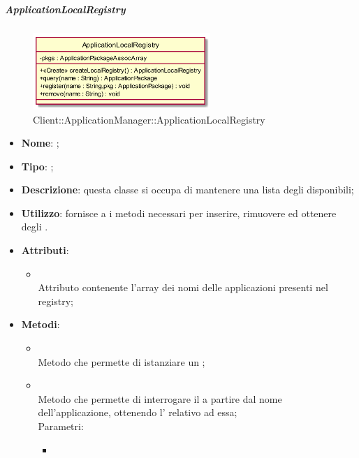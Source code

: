 \hypertarget{ApplicationLocalRegistry_label}{\subparagraph{ApplicationLocalRegistry}}
\begin{figure}[h]
	\centering
	\includegraphics[width=0.60\textwidth,height=\textheight,keepaspectratio]{images/ClassApplicationLocalRegistry.png}
	\caption{Client::ApplicationManager::ApplicationLocalRegistry}
\end{figure}
\begin{itemize}
	\item \textbf{Nome}: ;
	\item \textbf{Tipo}: ;
	\item \textbf{Descrizione}: questa classe si occupa di mantenere una lista degli  disponibili;
	\item \textbf{Utilizzo}: fornisce a  i metodi necessari per inserire, rimuovere ed ottenere degli .
	\item \textbf{Attributi}:
	\begin{itemize}
		\item[]  \\
		Attributo contenente l'array dei nomi delle applicazioni presenti nel registry;
	\end{itemize}
	\item \textbf{Metodi}:
	\begin{itemize}
		\item[]  \\		Metodo che permette di istanziare un ;\\
		\item[]  \\		Metodo che permette di interrogare il  a partire dal nome dell'applicazione, ottenendo l'  relativo ad essa;\\
		Parametri:
		\begin{itemize}
			\item {} \\

\end{itemize}
\end{itemize}
\end{itemize}
